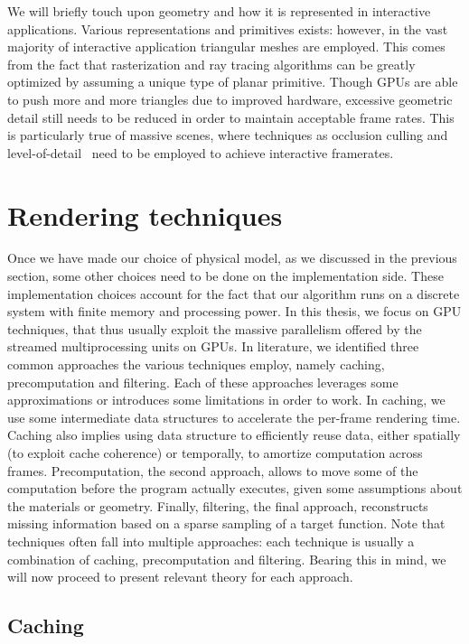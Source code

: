 We will briefly touch upon geometry and how it is represented in interactive applications. Various representations and primitives exists: however, in the vast majority of interactive application triangular meshes are employed. This comes from the fact that rasterization and ray tracing algorithms can be greatly optimized by assuming a unique type of planar primitive. Though GPUs are able to push more and more triangles due to improved hardware, excessive geometric detail still needs to be reduced in order to maintain acceptable frame rates. This is particularly true of massive scenes, where techniques as occlusion culling and level-of-detail~\cite{Clark1976} need to be employed to achieve interactive framerates. 

\section{Rendering techniques}
%
Once we have made our choice of physical model, as we discussed in the previous section,  some other choices need to be done on the implementation side. These implementation choices account for the fact that our algorithm runs on a discrete system with finite memory and processing power. In this thesis, we focus on GPU techniques, that thus usually exploit the massive parallelism offered by the streamed multiprocessing units on GPUs. In literature, we identified three common approaches the various techniques employ, namely caching, precomputation and filtering. Each of these approaches leverages some approximations or introduces some limitations in order to work. In caching, we use some intermediate data structures to accelerate the per-frame rendering time. Caching also implies using data structure to efficiently reuse data, either spatially (to exploit cache coherence) or temporally, to amortize computation across frames. Precomputation, the second approach, allows to move some of the computation before the program actually executes, given some assumptions about the materials or geometry. Finally, filtering, the final approach, reconstructs missing information based on a sparse sampling of a target function. Note that techniques often fall into multiple approaches: each technique is usually a combination of caching, precomputation and filtering. Bearing this in mind, we will now proceed to present relevant theory for each approach.
%
\subsection{Caching}

